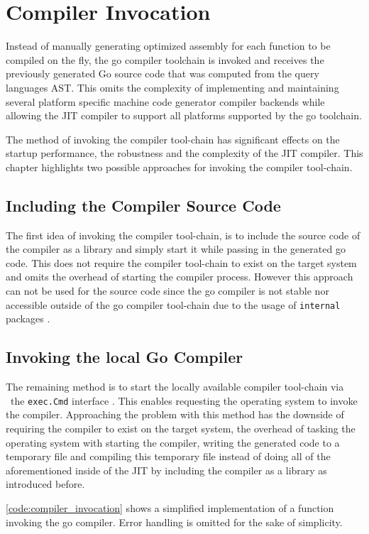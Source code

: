 \chapter{Compiler Invocation}

Instead of manually generating optimized assembly for each function to be
compiled on the fly, the go compiler toolchain is invoked and receives the
previously  generated Go source code that was computed from the query languages
AST. This omits the complexity of implementing and maintaining several platform
specific machine code generator compiler backends while allowing the JIT
compiler to support all platforms supported by the go toolchain.

The method of invoking the compiler tool-chain has significant effects on the
startup performance, the robustness and the complexity of the JIT compiler.
This chapter highlights two possible approaches for invoking the compiler
tool-chain. 

\section{Including the Compiler Source Code}

The first idea of invoking the compiler tool-chain, is to include the source
code of the compiler as a library and simply start it while passing in the
generated go code. This does not require the compiler tool-chain to exist on
the target system and omits the overhead of starting the compiler process.
However this approach can not be used for the source code since the go compiler
is not stable nor accessible outside of the go compiler tool-chain
\cite[\textit{(gcToolchain).gc}]{gc_source} due to the usage of
\texttt{internal} packages \cite{go_internal_dir}.

\section{Invoking the local Go Compiler}

The remaining method is to start the locally available compiler tool-chain via
\ the \texttt{exec.Cmd} interface \cite[Overview]{go_os_exec}. This enables
requesting the operating system to invoke the compiler. Approaching the problem
with this method has the downside of requiring the compiler to exist on the
target system, the overhead of tasking the operating system with starting the
compiler, writing the generated code to a temporary file and compiling this
temporary file instead of doing all of the aforementioned inside of the JIT by
including the compiler as a library as introduced before.

\autoref{code:compiler_invocation} shows a simplified implementation of a
function invoking the go compiler. Error handling is omitted for the sake of
simplicity.

